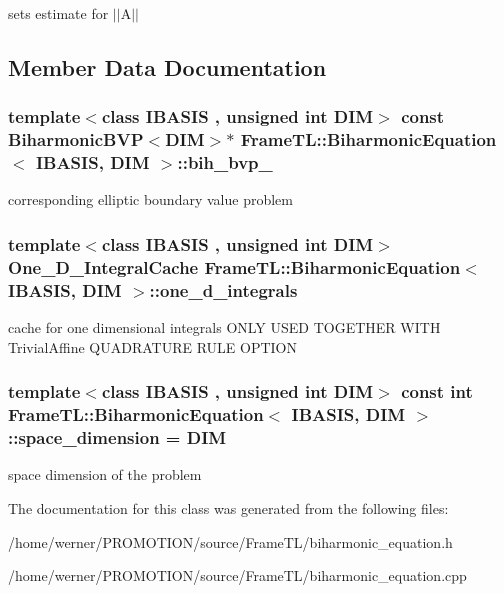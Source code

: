 sets estimate for $|$$|$A$|$$|$ 

\subsection{Member Data Documentation}
\hypertarget{classFrameTL_1_1BiharmonicEquation_31755efe61c40e44592198e134e4e2d0}{
\subsubsection[{bih\_\-bvp\_\-}]{\setlength{\rightskip}{0pt plus 5cm}template$<$class IBASIS , unsigned int DIM$>$ const BiharmonicBVP$<$DIM$>$$\ast$ {\bf FrameTL::BiharmonicEquation}$<$ IBASIS, DIM $>$::{\bf bih\_\-bvp\_\-}}}
\label{classFrameTL_1_1BiharmonicEquation_31755efe61c40e44592198e134e4e2d0}


corresponding elliptic boundary value problem \hypertarget{classFrameTL_1_1BiharmonicEquation_86bca5b3462307b9a3f20cd6f84c0e0f}{
\subsubsection[{one\_\-d\_\-integrals}]{\setlength{\rightskip}{0pt plus 5cm}template$<$class IBASIS , unsigned int DIM$>$ One\_\-D\_\-IntegralCache {\bf FrameTL::BiharmonicEquation}$<$ IBASIS, DIM $>$::{\bf one\_\-d\_\-integrals}}}
\label{classFrameTL_1_1BiharmonicEquation_86bca5b3462307b9a3f20cd6f84c0e0f}


cache for one dimensional integrals ONLY USED TOGETHER WITH TrivialAffine QUADRATURE RULE OPTION \hypertarget{classFrameTL_1_1BiharmonicEquation_8c79fee355dd2f68f56cd70a94e55511}{
\subsubsection[{space\_\-dimension}]{\setlength{\rightskip}{0pt plus 5cm}template$<$class IBASIS , unsigned int DIM$>$ const int {\bf FrameTL::BiharmonicEquation}$<$ IBASIS, DIM $>$::{\bf space\_\-dimension} = DIM}}
\label{classFrameTL_1_1BiharmonicEquation_8c79fee355dd2f68f56cd70a94e55511}


space dimension of the problem 

The documentation for this class was generated from the following files:\begin{CompactItemize}
\item 
/home/werner/PROMOTION/source/FrameTL/biharmonic\_\-equation.h\item 
/home/werner/PROMOTION/source/FrameTL/biharmonic\_\-equation.cpp\end{CompactItemize}
